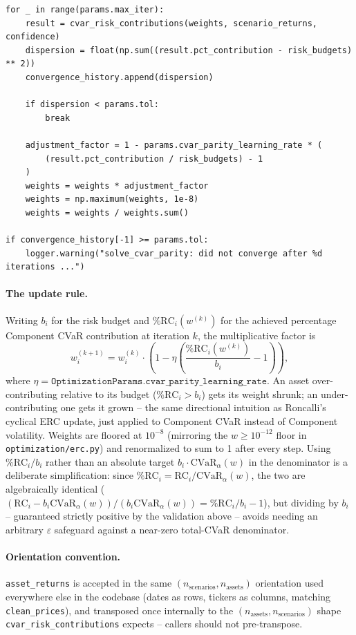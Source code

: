 \documentclass[11pt]{article}
\newcommand{\CVar}{\mathrm{CVaR}}
\begin{document}
\begin{lstlisting}
for _ in range(params.max_iter):
    result = cvar_risk_contributions(weights, scenario_returns, confidence)
    dispersion = float(np.sum((result.pct_contribution - risk_budgets) ** 2))
    convergence_history.append(dispersion)

    if dispersion < params.tol:
        break

    adjustment_factor = 1 - params.cvar_parity_learning_rate * (
        (result.pct_contribution / risk_budgets) - 1
    )
    weights = weights * adjustment_factor
    weights = np.maximum(weights, 1e-8)
    weights = weights / weights.sum()

if convergence_history[-1] >= params.tol:
    logger.warning("solve_cvar_parity: did not converge after %d iterations ...")
\end{lstlisting}

\paragraph{The update rule.} Writing $b_i$ for the risk budget and
$\%\text{RC}_i(w^{(k)})$ for the achieved percentage Component CVaR
contribution at iteration $k$, the multiplicative factor is
\[
w_i^{(k+1)} = w_i^{(k)} \cdot \left(1 - \eta \left(\frac{\%\text{RC}_i(w^{(k)})}{b_i} - 1\right)\right),
\]
where $\eta = \texttt{OptimizationParams.cvar\_parity\_learning\_rate}$.
An asset over-contributing relative to its budget
($\%\text{RC}_i > b_i$) gets its weight shrunk; an under-contributing
one gets it grown -- the same directional intuition as Roncalli's
cyclical ERC update, just applied to Component CVaR instead of
Component volatility. Weights are floored at $10^{-8}$ (mirroring the
$w \geq 10^{-12}$ floor in \texttt{optimization/erc.py}) and
renormalized to sum to 1 after every step. Using $\%\text{RC}_i / b_i$
rather than an absolute target $b_i \cdot \CVar_\alpha(w)$ in the
denominator is a deliberate simplification: since $\%\text{RC}_i =
\text{RC}_i / \CVar_\alpha(w)$, the two are algebraically identical
($(\text{RC}_i - b_i \CVar_\alpha(w))/(b_i \CVar_\alpha(w)) =
\%\text{RC}_i/b_i - 1$), but dividing by $b_i$ -- guaranteed strictly
positive by the validation above -- avoids needing an arbitrary
$\varepsilon$ safeguard against a near-zero total-CVaR denominator.

\paragraph{Orientation convention.} \texttt{asset\_returns} is accepted
in the same $(n_{\text{scenarios}}, n_{\text{assets}})$ orientation used
everywhere else in the codebase (dates as rows, tickers as columns,
matching \texttt{clean\_prices}), and transposed once internally to the
$(n_{\text{assets}}, n_{\text{scenarios}})$ shape
\texttt{cvar\_risk\_contributions} expects -- callers should not
pre-transpose.
\end{document}
